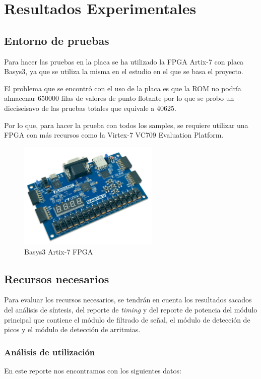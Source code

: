 \chapter{Resultados Experimentales}


\section{Entorno de pruebas}
Para hacer las pruebas en la placa se ha utilizado la FPGA Artix-7 con placa Basys3, ya que se utiliza la misma en el estudio en el que se basa el proyecto\cite{desai2021low}.

El problema que se encontró con el uso de la placa es que la ROM no podría almacenar 650000 filas de valores de punto flotante por lo que se probo un dieciseisavo de las pruebas totales que equivale a 40625.

Por lo que, para hacer la prueba con todos los samples, se requiere utilizar una FPGA con más recursos como la Virtex-7 VC709 Evaluation Platform.

\begin{figure}[h]
	\centering
	\includegraphics[width=0.6\textwidth]{./Images/img_introduccion/Basys3.jpg}
	\caption{Basys3 Artix-7 FPGA}
	\label{fig:Basys3}
\end{figure}

\section{Recursos necesarios}
	Para evaluar los recursos necesarios, se tendrán en cuenta los resultados sacados del análisis de síntesis, del reporte de  \textit{timing}  y del reporte de potencia del módulo principal que contiene el módulo de filtrado de señal,
	el módulo de detección de picos y el módulo de detección de arritmias. 
	
\subsection{Análisis de utilización}
En este reporte nos encontramos con los siguientes datos:


